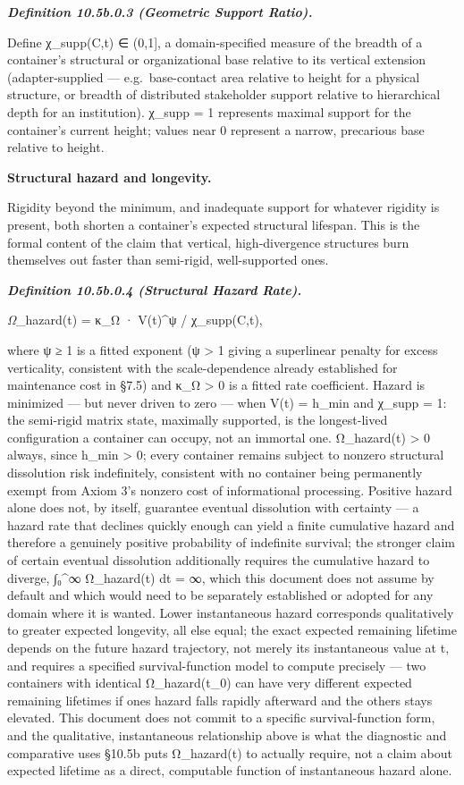 \documentclass[
]{article}
\begin{document}
\emph{\textbf{Definition 10.5b.0.3 (Geometric Support Ratio).}}

Define χ\_supp(C,t) ∈ (0,1{]}, a domain-specified measure of the breadth
of a container's structural or organizational base relative to its
vertical extension (adapter-supplied --- e.g.~base-contact area relative
to height for a physical structure, or breadth of distributed
stakeholder support relative to hierarchical depth for an institution).
χ\_supp = 1 represents maximal support for the container's current
height; values near 0 represent a narrow, precarious base relative to
height.

\textbf{Structural hazard and longevity.}

Rigidity beyond the minimum, and inadequate support for whatever
rigidity is present, both shorten a container's expected structural
lifespan. This is the formal content of the claim that vertical,
high-divergence structures burn themselves out faster than semi-rigid,
well-supported ones.

\emph{\textbf{Definition 10.5b.0.4 (Structural Hazard Rate).}}

\emph{Ω}\_hazard(t) = κ\_Ω · V(t)\^{}ψ / χ\_supp(C,t),

where ψ ≥ 1 is a fitted exponent (ψ \textgreater{} 1 giving a
superlinear penalty for excess verticality, consistent with the
scale-dependence already established for maintenance cost in §7.5) and
κ\_Ω \textgreater{} 0 is a fitted rate coefficient. Hazard is minimized
--- but never driven to zero --- when V(t) = h\_min and χ\_supp = 1: the
semi-rigid matrix state, maximally supported, is the longest-lived
configuration a container can occupy, not an immortal one. Ω\_hazard(t)
\textgreater{} 0 always, since h\_min \textgreater{} 0; every container
remains subject to nonzero structural dissolution risk indefinitely,
consistent with no container being permanently exempt from Axiom 3's
nonzero cost of informational processing. Positive hazard alone does
not, by itself, guarantee eventual dissolution with certainty --- a
hazard rate that declines quickly enough can yield a finite cumulative
hazard and therefore a genuinely positive probability of indefinite
survival; the stronger claim of certain eventual dissolution
additionally requires the cumulative hazard to diverge, ∫₀\^{}∞
Ω\_hazard(t) dt = ∞, which this document does not assume by default and
which would need to be separately established or adopted for any domain
where it is wanted. Lower instantaneous hazard corresponds qualitatively
to greater expected longevity, all else equal; the exact expected
remaining lifetime depends on the future hazard trajectory, not merely
its instantaneous value at t, and requires a specified survival-function
model to compute precisely --- two containers with identical
Ω\_hazard(t\_0) can have very different expected remaining lifetimes if
ones hazard falls rapidly afterward and the others stays elevated. This
document does not commit to a specific survival-function form, and the
qualitative, instantaneous relationship above is what the diagnostic and
comparative uses §10.5b puts Ω\_hazard(t) to actually require, not a
claim about expected lifetime as a direct, computable function of
instantaneous hazard alone.
\end{document}
